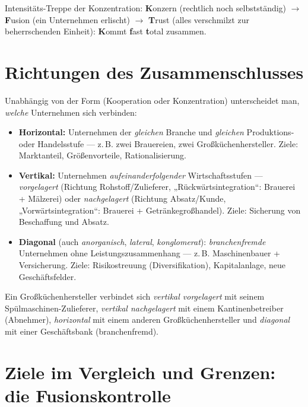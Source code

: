 \documentclass[11pt, a4paper]{article}
\begin{document}
\begin{eselsbruecke}
Intensitäts-Treppe der Konzentration: \textbf{K}onzern (rechtlich noch selbstständig)
$\rightarrow$ \textbf{F}usion (ein Unternehmen erlischt) $\rightarrow$ \textbf{T}rust
(alles verschmilzt zur beherrschenden Einheit): \textbf{K}ommt \textbf{f}ast
\textbf{t}otal zusammen.
\end{eselsbruecke}

\section{Richtungen des Zusammenschlusses}

Unabhängig von der Form (Kooperation oder Konzentration) unterscheidet man, \emph{welche}
Unternehmen sich verbinden:

\begin{itemize}
  \item \textbf{Horizontal:} Unternehmen der \emph{gleichen} Branche und
    \emph{gleichen} Produktions- oder Handelsstufe --- z.\,B. zwei Brauereien, zwei
    Großküchenhersteller. Ziele: Marktanteil, Größenvorteile, Rationalisierung.
  \item \textbf{Vertikal:} Unternehmen \emph{aufeinanderfolgender} Wirtschaftsstufen ---
    \emph{vorgelagert} (Richtung Rohstoff/Zulieferer, „Rückwärtsintegration``: Brauerei +
    Mälzerei) oder \emph{nachgelagert} (Richtung Absatz/Kunde, „Vorwärtsintegration``:
    Brauerei + Getränkegroßhandel). Ziele: Sicherung von Beschaffung und Absatz.
  \item \textbf{Diagonal} (auch \emph{anorganisch}, \emph{lateral},
    \emph{konglomerat}): \emph{branchenfremde} Unternehmen ohne
    Leistungszusammenhang --- z.\,B. Maschinenbauer + Versicherung. Ziele:
    Risikostreuung (Diversifikation), Kapitalanlage, neue Geschäftsfelder.
\end{itemize}

\begin{beispiel}[title={Beispiel aus dem Übungsband (Übung 56): Großküchenhersteller}]
Ein Großküchenhersteller verbindet sich \emph{vertikal vorgelagert} mit seinem
Spülmaschinen-Zulieferer, \emph{vertikal nachgelagert} mit einem Kantinenbetreiber
(Abnehmer), \emph{horizontal} mit einem anderen Großküchenhersteller und
\emph{diagonal} mit einer Geschäftsbank (branchenfremd).
\end{beispiel}

\section{Ziele im Vergleich und Grenzen: die Fusionskontrolle}
\end{document}
